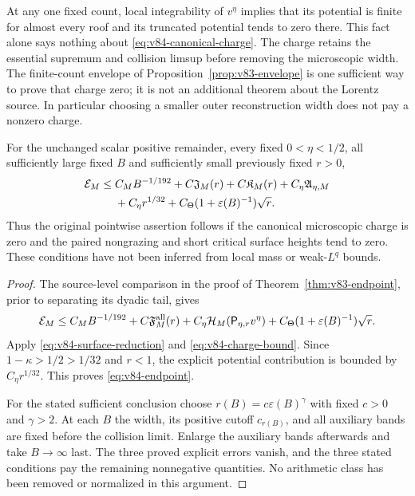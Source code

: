 \begin{remark}
\label{rem:v84-charge-scope}
At any one fixed count, local integrability of $v^\eta$ implies
that its potential is finite for almost every roof and its truncated
potential tends to zero there. This fact alone says nothing about
\eqref{eq:v84-canonical-charge}. The charge retains the essential
supremum and collision limsup before removing the microscopic width.
The finite-count envelope of Proposition~\ref{prop:v83-envelope}
is one sufficient way to prove that charge zero; it is not an
additional theorem about the Lorentz source. In particular choosing
a smaller outer reconstruction width does not pay a nonzero charge.
\end{remark}

\begin{theorem}
\label{thm:v84-endpoint}
For the unchanged scalar positive remainder, every fixed
$0<\eta<1/2$, all sufficiently large fixed $B$ and sufficiently
small previously fixed $r>0$,
\begin{align}
 \mathcal E_M\le{}& C_MB^{-1/192}
      +C\mathfrak J_M(r)+C\mathfrak K_M(r)
      +C_\eta\mathfrak A_{\eta,M}\notag\\
      &+C_\eta r^{1/32}
              +C_\Theta(1+\varepsilon(B)^{-1})\sqrt r.
                                            \label{eq:v84-endpoint}
\end{align}
Thus the original pointwise assertion follows if the canonical
microscopic charge is zero and the paired nongrazing and short
critical surface heights tend to zero. These conditions have not
been inferred from local mass or weak-$L^q$ bounds.
\end{theorem}
\begin{proof}
The source-level comparison in the proof of
Theorem~\ref{thm:v83-endpoint}, prior to separating its dyadic tail,
gives
\[
 \mathcal E_M\le C_MB^{-1/192}+C\mathfrak F_M^{\rm all}(r)
  +C_\eta\mathcal H_M(\mathsf P_{\eta,r}v^\eta)
  +C_\Theta(1+\varepsilon(B)^{-1})\sqrt r.
\]
Apply \eqref{eq:v84-surface-reduction} and
\eqref{eq:v84-charge-bound}. Since $1-\kappa>1/2>1/32$ and
$r<1$, the explicit potential contribution is bounded by
$C_\eta r^{1/32}$. This proves \eqref{eq:v84-endpoint}.

For the stated sufficient conclusion choose
$r(B)=c\varepsilon(B)^\gamma$ with fixed $c>0$ and $\gamma>2$.
At each $B$ the width, its positive cutoff $c_{r(B)}$, and all
auxiliary bands are fixed before the collision limit. Enlarge the
auxiliary bands afterwards and take $B\to\infty$ last. The three
proved explicit errors vanish, and the three stated conditions pay
the remaining nonnegative quantities. No arithmetic class has been
removed or normalized in this argument.
\end{proof}

